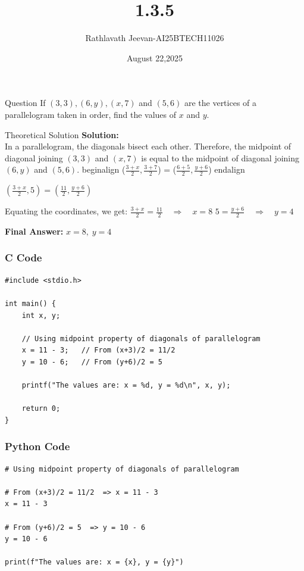 \documentclass{beamer}
\title %
{1.3.5}
\date{August 22,2025}
\author %
{Rathlavath Jeevan-AI25BTECH11026}
\begin{document}
\frame{\titlepage}
\begin{frame}{Question}
If $(3,3), (6,y), (x,7)$ and $(5,6)$ are the vertices of a parallelogram taken in order, 
find the values of $x$ and $y$.
\end{frame}



\begin{frame}{Theoretical Solution}
\textbf{Solution:} \\
In a parallelogram, the diagonals bisect each other. Therefore, the midpoint of diagonal 
joining $(3,3)$ and $(x,7)$ is equal to the midpoint of diagonal joining $(6,y)$ and $(5,6)$.
begin{align}
($\frac{3+x}{2}, \frac{3+7}{2}$) 
= ($\frac{6+5}{2}, \frac{y+6}{2}$)
end{align}

$
\left(\frac{3+x}{2}, 5\right) = \left(\frac{11}{2}, \frac{y+6}{2}\right)
$

Equating the coordinates, we get:
$
\frac{3+x}{2} = \frac{11}{2} \quad \Rightarrow \quad x=8
$
$
5 = \frac{y+6}{2} \quad \Rightarrow \quad y=4
$

\bigskip
\textbf{Final Answer:} \quad $x=8, \; y=4$
\end{frame}




\begin{frame}[fragile]
    \frametitle{C Code }

    \begin{lstlisting}
#include <stdio.h>

int main() {
    int x, y;

    // Using midpoint property of diagonals of parallelogram
    x = 11 - 3;   // From (x+3)/2 = 11/2
    y = 10 - 6;   // From (y+6)/2 = 5

    printf("The values are: x = %d, y = %d\n", x, y);

    return 0;
}

    \end{lstlisting}
\end{frame}



\begin{frame}[fragile]
    \frametitle{Python Code}
    \begin{lstlisting}
# Using midpoint property of diagonals of parallelogram

# From (x+3)/2 = 11/2  => x = 11 - 3
x = 11 - 3  

# From (y+6)/2 = 5  => y = 10 - 6
y = 10 - 6  

print(f"The values are: x = {x}, y = {y}")


    \end{lstlisting}
\end{frame}
\end{document}
